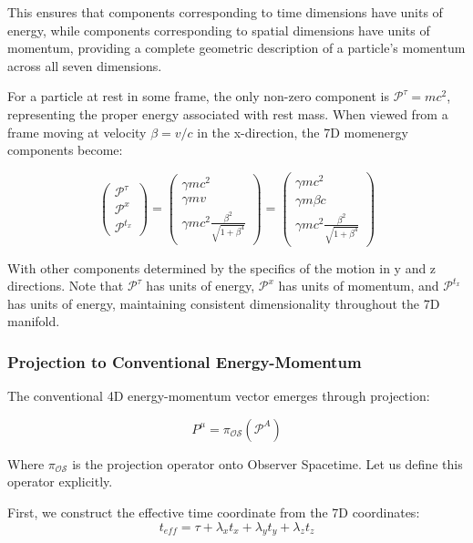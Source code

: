 \documentclass{article}
\begin{document}
This ensures that components corresponding to time dimensions have units of energy, while components corresponding to spatial dimensions have units of momentum, providing a complete geometric description of a particle's momentum across all seven dimensions.

For a particle at rest in some frame, the only non-zero component is $\mathcal{P}^\tau = mc^2$, representing the proper energy associated with rest mass. When viewed from a frame moving at velocity $\beta = v/c$ in the x-direction, the 7D momenergy components become:

\begin{equation}
\begin{pmatrix} \mathcal{P}^\tau \\ \mathcal{P}^x \\ \mathcal{P}^{t_x} \end{pmatrix} = 
\begin{pmatrix} \gamma mc^2 \\ \gamma mv \\ \gamma mc^2 \frac{\beta^2}{\sqrt{1+\beta^4}} \end{pmatrix} = 
\begin{pmatrix} \gamma mc^2 \\ \gamma m\beta c \\ \gamma mc^2 \frac{\beta^2}{\sqrt{1+\beta^4}} \end{pmatrix}
\end{equation}

With other components determined by the specifics of the motion in y and z directions. Note that $\mathcal{P}^\tau$ has units of energy, $\mathcal{P}^x$ has units of momentum, and $\mathcal{P}^{t_x}$ has units of energy, maintaining consistent dimensionality throughout the 7D manifold.

\subsubsection{Projection to Conventional Energy-Momentum}

The conventional 4D energy-momentum vector emerges through projection:

\begin{equation}
P^\mu = \pi_{\mathcal{OS}}(\mathcal{P}^A)
\end{equation}

Where $\pi_{\mathcal{OS}}$ is the projection operator onto Observer Spacetime. Let us define this operator explicitly.

First, we construct the effective time coordinate from the 7D coordinates:
\begin{equation}
t_{eff} = \tau + \lambda_x t_x + \lambda_y t_y + \lambda_z t_z
\end{equation}
\end{document}
